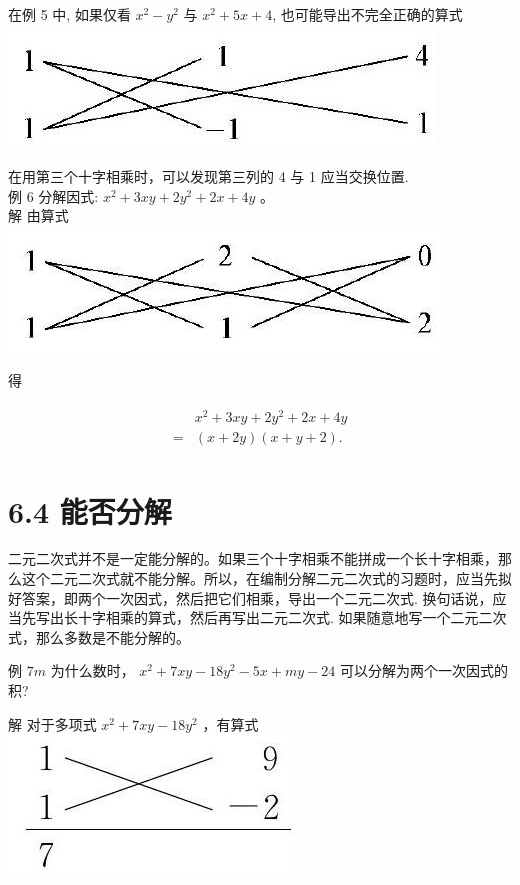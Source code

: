\documentclass[10pt]{article}
\begin{document}
在例 5 中, 如果仅看 $x^{2}-y^{2}$ 与 $x^{2}+5 x+4$, 也可能导出不完全正确的算式\\
\includegraphics[max width=\textwidth, center]{2024_10_30_bd799899fef40368a068g-044(2)}

在用第三个十字相乘时，可以发现第三列的 4 与 1 应当交换位置.\\
例 6 分解因式: $x^{2}+3 x y+2 y^{2}+2 x+4 y$ 。\\
解 由算式\\
\includegraphics[max width=\textwidth, center]{2024_10_30_bd799899fef40368a068g-044}

得

\begin{align*}
\begin{aligned}
& x^{2}+3 x y+2 y^{2}+2 x+4 y \\
= & (x+2 y)(x+y+2) .
\end{aligned}
\end{align*}

\section*{6.4 能否分解}
二元二次式并不是一定能分解的。如果三个十字相乘不能拼成一个长十字相乘，那么这个二元二次式就不能分解。所以，在编制分解二元二次式的习题时，应当先拟好答案，即两个一次因式，然后把它们相乘，导出一个二元二次式. 换句话说，应当先写出长十字相乘的算式，然后再写出二元二次式. 如果随意地写一个二元二次式，那么多数是不能分解的。

例 $7 m$ 为什么数时， $x^{2}+7 x y-18 y^{2}-5 x+m y-24$ 可以分解为两个一次因式的积?

解 对于多项式 $x^{2}+7 x y-18 y^{2}$ ，有算式\\
\includegraphics[max width=\textwidth, center]{2024_10_30_bd799899fef40368a068g-045(2)}
\end{document}
